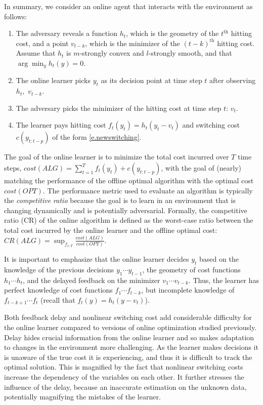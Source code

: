 In summary, we consider an online agent that interacts with the environment as follows:
\begin{enumerate}%
    \item The adversary reveals a function $h_t$, which is the geometry of the $t^\mathrm{th}$ hitting cost, and a point $v_{t-k}$, which is the minimizer of the $(t-k)^\mathrm{th}$ hitting cost. Assume that $h_t$ is $m$-strongly convex and $l$-strongly smooth, and that $\arg\min_y h_t(y)=0$.
    \item The online learner picks $y_t$ as its decision point at time step $t$ after observing $h_t,$  $v_{t-k}$.
    \item The adversary picks the minimizer of the hitting cost at time step $t$: $v_t$. 
    \item The learner pays hitting cost $f_t(y_t)=h_t(y_t-v_t)$ and switching cost $c(y_{t:t-p})$ of the form \eqref{e.newswitching}.
\end{enumerate}

The goal of the online learner is to minimize the total cost incurred over $T$ time steps, $cost(ALG)=\sum_{t=1}^Tf_t(y_t)+c(y_{t:t-p})$, with the goal of (nearly) matching the performance of the offline optimal algorithm with the optimal cost $cost(OPT)$. The performance metric used to evaluate an algorithm is typically the \textit{competitive ratio} because the goal is to learn in an environment that is changing dynamically and is potentially adversarial. Formally, the competitive ratio (CR) of the online algorithm is defined as the worst-case ratio between the total cost incurred by the online learner and the offline optimal cost: $CR(ALG)=\sup_{f_{1:T}}\frac{cost(ALG)}{cost(OPT)}$.

It is important to emphasize that the online learner decides $y_t$ based on the knowledge of the previous decisions $y_1\cdots y_{t-1}$, the geometry of cost functions $h_1\cdots h_t$, and the delayed feedback on the minimizer $v_1\cdots v_{t-k}$. Thus, the learner has perfect knowledge of cost functions $f_1\cdots f_{t-k}$, but incomplete knowledge of $f_{t-k+1}\cdots f_t$ (recall that $f_t(y)=h_t(y-v_t)$).

Both feedback delay and nonlinear switching cost add considerable difficulty for the online learner compared to versions of online optimization studied previously. Delay hides crucial information from the online learner and so makes adaptation to changes in the environment more challenging. As the learner makes decisions it is unaware of the true cost it is experiencing, and thus it is difficult to track the optimal solution. This is magnified by the fact that nonlinear switching costs increase the dependency of the variables on each other. It further stresses the influence of the delay, because an inaccurate estimation on the unknown data, potentially magnifying the mistakes of the learner. 

